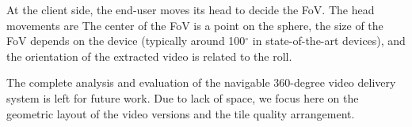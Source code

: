 At the client side, the end-user moves its head to decide the \ac{FoV}. The head movements
are 
 The center of the \ac{FoV} is a
point on the sphere, the size of the \ac{FoV} depends on the device (typically
around 100$^\circ$ in state-of-the-art devices), and the orientation of the extracted video
is related to the roll.

The complete analysis and evaluation of the navigable 360-degree video delivery system
is left for future work. Due to lack of space, we focus here on the geometric layout
of the video versions and the tile quality arrangement.













